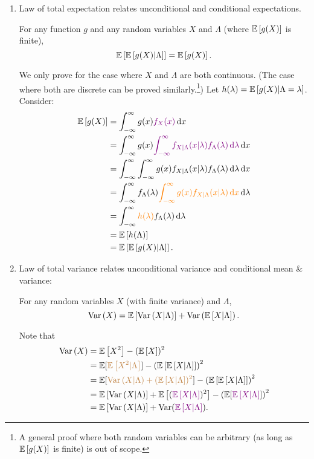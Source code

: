 \begin{enumerate}
\item Law of total expectation relates unconditional and conditional
expectations.
\begin{theorem}
\label{thm:lote}
For any function \(g\) and any random variables \(X\) and \(\Lambda\) (where
\(\mathbb{E}\left[g(X)\right]\) is finite),
\[
\mathbb{E}\left[\mathbb{E}\left[g(X)|\Lambda\right]\right]=\mathbb{E}\left[g(X)\right].
\]
\end{theorem}
\begin{pf}
We only prove for the case where \(X\) and \(\Lambda\) are both continuous.
(The case where both are discrete can be proved similarly.\footnote{A general proof
where both random variables can be arbitrary (as long as \(\mathbb{E}\left[g(X)\right]\) is
finite) is out of scope.}) Let \(h(\lambda)=\mathbb{E}\left[g(X)|\Lambda=\lambda\right]\).
Consider:
\begin{align*}
\mathbb{E}\left[g(X)\right]&=\int_{-\infty}^{\infty}g(x){\color{violet}f_{X}(x)}\dd{x}\\
&=\int_{-\infty}^{\infty}g(x){\color{violet}\int_{-\infty}^{\infty}
f_{X|\Lambda}(x|\lambda)f_{\Lambda}(\lambda)\dd{\lambda}}\dd{x}\\
&=\int_{-\infty}^{\infty}\int_{-\infty}^{\infty}
g(x)f_{X|\Lambda}(x|\lambda)f_{\Lambda}(\lambda)\dd{\lambda}\dd{x}\\
&=\int_{-\infty}^{\infty}f_{\Lambda}(\lambda){\color{orange}\int_{-\infty}^{\infty}
g(x)f_{X|\Lambda}(x|\lambda)\dd{x}}\dd{\lambda}\\
&=\int_{-\infty}^{\infty}{\color{orange}h(\lambda)}f_{\Lambda}(\lambda)\dd{\lambda}\\
&=\mathbb{E}\left[h(\Lambda)\right]\\
&=\mathbb{E}\left[\mathbb{E}\left[g(X)|\Lambda\right]\right].
\end{align*}
\end{pf}
\item Law of total variance relates unconditional variance and conditional mean
\& variance:
\begin{proposition}
\label{thm:lotv}
For any random variables \(X\) (with finite variance) and \(\Lambda\),
\[
\operatorname{Var}\left(X\right)=\mathbb{E}\left[\operatorname{Var}\left(X|\Lambda\right)\right]+\operatorname{Var}\left(\mathbb{E}\left[X|\Lambda\right]\right).
\]
\end{proposition}
\begin{pf}
Note that
\begin{align*}
\operatorname{Var}\left(X\right)&=\mathbb{E}\left[X^2\right]-(\mathbb{E}\left[X\right])^{2}\\
&=\mathbb{E}[{\color{brown}\mathbb{E}\left[X^2|\Lambda\right]}]-\qty(\mathbb{E}\left[\mathbb{E}\left[X|\Lambda\right]\right])^{2}\\
&=\mathbb{E}[{\color{brown}\operatorname{Var}\left(X|\Lambda\right)+(\mathbb{E}\left[X|\Lambda\right])^{2}}]-\qty(\mathbb{E}\left[\mathbb{E}\left[X|\Lambda\right]\right])^{2}\\
&=\mathbb{E}\left[\operatorname{Var}\left(X|\Lambda\right)\right]+\mathbb{E}\left[({\color{violet}\mathbb{E}\left[X|\Lambda\right]})^{2}\right]
-\qty(\mathbb{E}[{\color{violet}\mathbb{E}\left[X|\Lambda\right]}])^{2}\\
&=\mathbb{E}\left[\operatorname{Var}\left(X|\Lambda\right)\right]+\operatorname{Var}({\color{violet}\mathbb{E}\left[X|\Lambda\right]}).
\end{align*}
\end{pf}
\end{enumerate}

